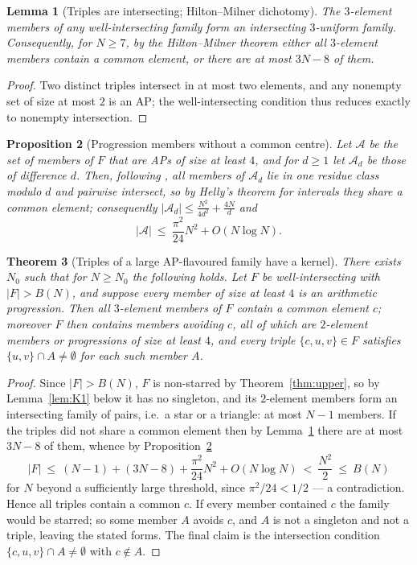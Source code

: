 \documentclass[11pt]{article}
\newtheorem{theorem}{Theorem}[section]
\newtheorem{lemma}[theorem]{Lemma}
\newtheorem{proposition}[theorem]{Proposition}
\theoremstyle{definition}
\begin{document}
\begin{lemma}[Triples are intersecting; Hilton--Milner dichotomy]\label{lem:HM}
The $3$-element members of any well-intersecting family form an intersecting $3$-uniform family. Consequently, for $N\ge7$, by the Hilton--Milner theorem \cite{HM67} either all $3$-element members contain a common element, or there are at most $3N-8$ of them.
\end{lemma}

\begin{proof}
Two distinct triples intersect in at most two elements, and any nonempty set of size at most $2$ is an AP; the well-intersecting condition thus reduces exactly to nonempty intersection.
\end{proof}

\begin{proposition}[Progression members without a common centre]\label{prop:helly}
Let $\mathcal A$ be the set of members of $F$ that are APs of size at least $4$, and for $d\ge1$ let $\mathcal A_d$ be those of difference $d$. Then, following \cite[Corollary~2.4]{Sz99}, all members of $\mathcal A_d$ lie in one residue class modulo $d$ and pairwise intersect, so by Helly's theorem for intervals they share a common element; consequently $|\mathcal A_d|\le \frac{N^2}{4d^2}+\frac{4N}{d}$ and
\[ |\mathcal A|\ \le\ \frac{\pi^2}{24}N^2+O(N\log N). \]
\end{proposition}

\begin{theorem}[Triples of a large AP-flavoured family have a kernel]\label{thm:tristar}
There exists $N_0$ such that for $N\ge N_0$ the following holds. Let $F$ be well-intersecting with $|F|>B(N)$, and suppose every member of size at least $4$ is an arithmetic progression. Then all $3$-element members of $F$ contain a common element $c$; moreover $F$ then contains members avoiding $c$, all of which are $2$-element members or progressions of size at least $4$, and every triple $\{c,u,v\}\in F$ satisfies $\{u,v\}\cap A\neq\emptyset$ for each such member $A$.
\end{theorem}

\begin{proof}
Since $|F|>B(N)$, $F$ is non-starred by Theorem~\ref{thm:upper}, so by Lemma~\ref{lem:K1} below it has no singleton, and its $2$-element members form an intersecting family of pairs, i.e.\ a star or a triangle: at most $N-1$ members. If the triples did not share a common element then by Lemma~\ref{lem:HM} there are at most $3N-8$ of them, whence by Proposition~\ref{prop:helly}
\[ |F|\ \le\ (N-1)+(3N-8)+\frac{\pi^2}{24}N^2+O(N\log N)\ <\ \frac{N^2}{2}\ \le\ B(N) \]
for $N$ beyond a sufficiently large threshold, since $\pi^2/24<1/2$ --- a contradiction. Hence all triples contain a common $c$. If every member contained $c$ the family would be starred; so some member $A$ avoids $c$, and $A$ is not a singleton and not a triple, leaving the stated forms. The final claim is the intersection condition $\{c,u,v\}\cap A\neq\emptyset$ with $c\notin A$.
\end{proof}
\end{document}
